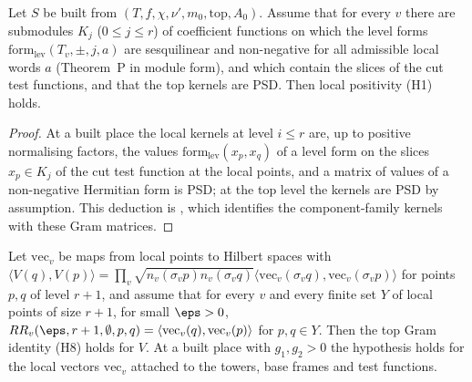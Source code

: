\begin{lemma}\label{pf:thmS-carrier:posmodule}
Let $S$ be built from $(T,f,\chi,\nu',m_0,\mathrm{top},A_0)$. Assume that for every $v$ there are submodules $K_j$
($0\le j\le r$) of coefficient functions on which the level forms $\mathrm{form}_{\mathrm{lev}}(T_v,\pm,j,a)$ are sesquilinear
and non-negative for all admissible local words $a$ (Theorem~P in module form), and which contain the slices of the cut test
functions, and that the top kernels are PSD. Then local positivity (H1) holds.
\end{lemma}

\begin{proof}
At a built place the local kernels at level $i\le r$ are, up to positive normalising factors, the values
$\mathrm{form}_{\mathrm{lev}}(x_p,x_q)$ of a level form on the slices $x_p\in K_j$ of the cut test function at the local
points, and a matrix of values of a non-negative Hermitian form is PSD; at the top level the kernels are PSD by assumption.
This deduction is , which identifies the component-family kernels
with these Gram matrices.
\end{proof}

\begin{lemma}\label{pf:thmS-carrier:gramtop}
Let $\mathrm{vec}_v$ be maps from local points to Hilbert spaces with
$\langle V(q),V(p)\rangle=\prod_v\sqrt{n_v(\sigma_vp)n_v(\sigma_vq)}\langle\mathrm{vec}_v(\sigma_vq),\mathrm{vec}_v(\sigma_vp)
\rangle$ for points $p,q$ of level $r+1$, and assume that for every $v$ and every finite set $Y$ of local points of size $r+1$,
for small $\eps>0$, $RR_v(\eps,r+1,\emptyset,p,q)=\langle\mathrm{vec}_v(q),\mathrm{vec}_v(p)\rangle$ for $p,q\in Y$. Then the top
Gram identity (H8) holds for $V$. At a built place with $g_1,g_2>0$ the hypothesis holds for the local vectors $\mathrm{vec}_v$
attached to the towers, base frames and test functions.
\end{lemma}

